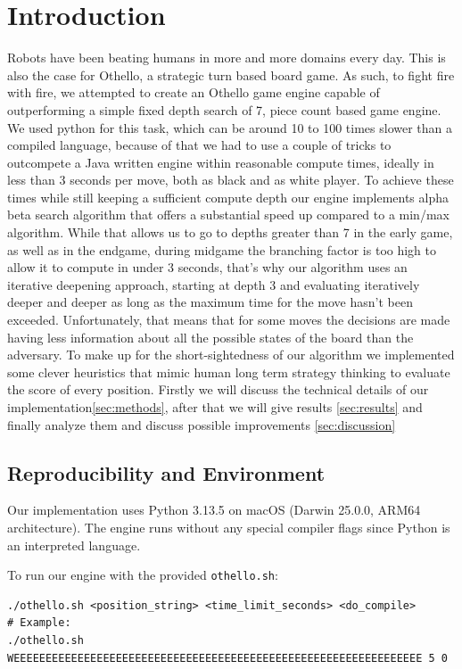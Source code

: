 \documentclass[10pt, titlepage, oneside, a4paper]{article}
\begin{document}
\section{Introduction}
\label{sec:intro}
Robots have been beating humans in more and more domains every day. This is also the case for Othello, a strategic turn based board game. As such, to fight fire with fire, we attempted to create an Othello game engine capable of outperforming a simple fixed depth search of 7, piece count based game engine. 
We used python for this task, which can be around 10 to 100 times slower than a compiled language, because of that we had to use a couple of tricks to outcompete a Java written engine within reasonable compute times, ideally in less than 3 seconds per move, both as black and as white player. To achieve these times while still keeping a sufficient compute depth our engine implements alpha beta search algorithm that offers a substantial speed up compared to a min/max algorithm. While that allows us to go to depths greater than 7 in the early game, as well as in the endgame, during midgame the branching factor is too high to allow it to compute in under 3 seconds, that's why our algorithm uses an iterative deepening approach, starting at depth 3 and evaluating iteratively deeper and deeper as long as the maximum time for the move hasn't been exceeded. Unfortunately, that means that for some moves the decisions are made having less information about all the possible states of the board than the adversary. To make up for the short-sightedness of our algorithm we implemented some clever heuristics that mimic human long term strategy thinking to evaluate the score of every position. 
Firstly we will discuss the technical details of our implementation\ref{sec:methods}, after that we will give results \ref{sec:results} and finally analyze them and discuss possible improvements \ref{sec:discussion}



\subsection{Reproducibility and Environment}
Our implementation uses Python 3.13.5 on macOS (Darwin 25.0.0, ARM64 architecture). The engine runs without any special compiler flags since Python is an interpreted language.

To run our engine with the provided \texttt{othello.sh}:
\begin{verbatim}
./othello.sh <position_string> <time_limit_seconds> <do_compile>
# Example:
./othello.sh WEEEEEEEEEEEEEEEEEEEEEEEEEEEEEEEEEEEEEEEEEEEEEEEEEEEEEEEEEEEEEEEE 5 0
\end{verbatim}
\end{document}
